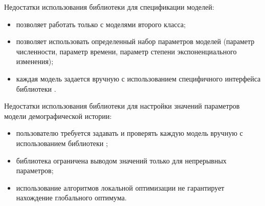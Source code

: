 \documentclass[a4paper,14pt,oneside,openany,article]{memoir}
\begin{document}
Недостатки использования библиотеки \momi для спецификации моделей:
\begin{itemize}
    \item позволяет работать только с моделями второго класса;
    \item позволяет использовать определенный набор параметров моделей (параметр численности, параметр времени, параметр степени экспоненциального изменения);
    \item каждая модель задается вручную с использованием специфичного интерфейса библиотеки \momi.
\end{itemize}

Недостатки использования библиотеки \momi для настройки значений параметров модели демографической истории:
\begin{itemize}
    \item пользователю требуется задавать и проверять каждую модель вручную с использованием библиотеки \momi;
    \item библиотека ограничена выводом значений только для непрерывных параметров;
    \item использование алгоритмов локальной оптимизации не гарантирует нахождение глобального оптимума.
\end{itemize}
\end{document}
